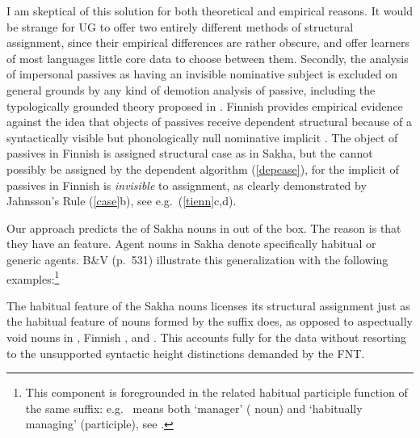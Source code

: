 \documentclass[output=paper,
modfonts
]{LSP/langsci}
\newcommand{\rf}[1]{(\ref{#1})}
\newcommand{\rfa}[2]{(\ref{#1}{#2})}
\def\urf#1{$^{\textrm{\scriptsize{#1}}}$}
\begin{document}
I am skeptical of this solution for both theoretical and empirical reasons.  It would be
strange for UG to offer two entirely different methods of structural  assignment, since
their empirical differences are rather obscure, and offer learners of most languages little
core data to choose between them.  Secondly, the analysis of impersonal passives as having an
invisible nominative  subject is excluded on general grounds by any kind of demotion
analysis of passive, including the typologically grounded theory proposed in \citealt{kiparsky2013}.
Finnish provides empirical evidence against the idea that objects of passives receive dependent
structural  because of a syntactically visible but phonologically null nominative implicit
.  The object of passives in Finnish is assigned structural case as in Sakha, but the 
cannot possibly be assigned by the dependent  algorithm \rf{depcase}, for the implicit
 of passives in Finnish is \textit{invisible} to  assignment, as clearly demonstrated
by Jahnsson's Rule \rfa{case}{b}, see e.g.\ \rfa{tienn}{c,d}.

Our approach predicts the  of Sakha  nouns in  out of the box.
The reason is that they have an  feature.  Agent nouns in Sakha  denote
specifically habitual or generic agents.  B\&V (p.\ 531) illustrate this generalization with
the following examples:\footnote{This component is foregrounded in the related habitual
  participle function of the same suffix:  e.g.\  means both `manager'
  ( noun) and `habitually managing' (participle), see \citet[123]{vinokurova2005}.}
\begin{exe}
\ex
\begin{xlist}
\end{xlist}
\end{exe}
The habitual  feature of the Sakha  nouns licenses its structural  assignment
just as the habitual  feature of  nouns formed by the   suffix
\form{′-tar-\urf{V}} does, as opposed to aspectually void  nouns in
\form{-tár-\urf{N}}, Finnish , and  .  This accounts fully for
the  data without resorting to the unsupported syntactic height distinctions demanded by
the FNT.
\end{document}
